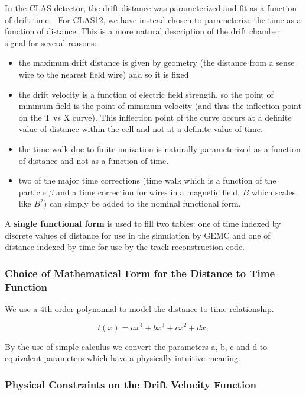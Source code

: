 In the CLAS detector, the drift distance was parameterized and fit as a function
of drift time.~\cite{mdm95}
For CLAS12, we have instead chosen to parameterize the time as a function of
distance.  This is a more natural description of the drift chamber signal
for several reasons:
\begin{itemize}
\item the maximum drift distance is given by geometry (the distance from
a sense wire to the nearest field wire) and so it is fixed
\item the drift velocity is a function of electric field strength, so the
point of minimum field is the point of minimum velocity (and thus the inflection point on the T vs X curve). 
This inflection point of the curve occurs at a
definite value of distance within the cell and not at a definite value of time.
\item the time walk due to finite ionization is
naturally parameterized as a function of distance and not as a function of time.
\item two of the major time corrections (time walk which is a function of the
particle $\beta$ and a time correction for wires in a magnetic field, $B$ which
scales like $B^2$) can simply be added to the nominal functional form.
\end{itemize}

A {\bf single functional form} is used to fill two tables: one of time indexed by discrete
values of distance for use in the simulation by GEMC and one of 
distance indexed by time for use by the track reconstruction code.


\subsubsection{Choice of Mathematical Form for the Distance to Time Function}
We use a 4th order polynomial to model the distance to time relationship.

\begin{equation}
t(x) =  a x^4 + b x^3 + c x^2 + d x,
\end{equation}


By the use of simple calculus we convert the parameters a, b, c and d to equivalent parameters which have
a physically intuitive meaning.

\subsubsection{Physical Constraints on the Drift Velocity Function}

